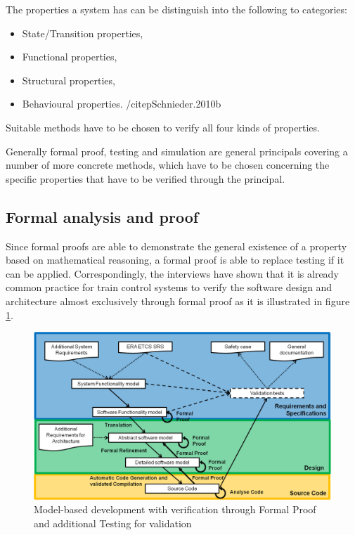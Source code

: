\documentclass{./template/openetcs2}
\begin{document}
The properties a system has can be distinguish into the following to categories:

\vspace{-10pt}
\begin{itemize}[topsep=2pt, partopsep=2pt,itemsep=2pt,parsep=2pt]
\item State/Transition properties,
\item Functional properties,
\item Structural properties,
\item Behavioural properties. /citep{Schnieder.2010b}
\end{itemize}

Suitable methods have to be chosen to verify all four kinds of properties. 

Generally formal proof, testing and simulation are general principals covering a number of more concrete methods, which have to be chosen concerning the specific properties that have to be verified through the principal.

\subsection{ Formal analysis and proof}

Since formal proofs are able to demonstrate the general existence of a property based on mathematical reasoning, a formal proof is able to replace testing if it can be applied. Correspondingly, the interviews have shown that it is already common practice for train control systems to verify the software design and architecture almost exclusively through formal proof as it is illustrated in figure \ref{fig: MBD-Formal-Proof}.

\begin{figure}[ht]
\centering
\includegraphics[scale=0.6]{Lifecycle-Model-based-Approach-Formal-Proof.png}
\caption{Model-based development with verification through Formal Proof and additional Testing for validation}
\label{fig: MBD-Formal-Proof}
\end{figure}
\end{document}
